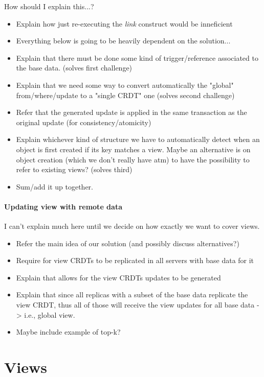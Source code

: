 \documentclass{vldb}
\newcommand{\grumbler}[2]{{\color{red}{\bf #1:} #2}}
\newcommand{\andre}[1]{\grumbler{andre}{#1}}
\begin{document}
\andre{How should I explain this...?}

\begin{itemize}
	\item Explain how just re-executing the \emph{link} construct would be inneficient
	\item Everything below is going to be heavily dependent on the solution... 
	\item Explain that there must be done some kind of trigger/reference associated to the base data. (solves first challenge)
	\item Explain that we need some way to convert automatically the "global" from/where/update to a "single CRDT" one (solves second challenge)
	\item Refer that the generated update is applied in the same transaction as the original update (for consistency/atomicity)
	\item Explain whichever kind of structure we have to automatically detect when an object is first created if its key matches a view. Maybe an alternative is on object creation (which we don't really have atm) to have the possibility to refer to existing views? (solves third)
	\item Sum/add it up together.
\end{itemize}

\paragraph{Updating view with remote data}

\andre{I can't explain much here until we decide on how exactly we want to cover views.}

\begin{itemize}
	\item Refer the main idea of our solution (and possibly discuss alternatives?)
	\item Require for view CRDTs to be replicated in all servers with base data for it
	\item Explain that allows for the view CRDTs updates to be generated
	\item Explain that since all replicas with a subset of the base data replicate the view CRDT, thus all of those will receive the view updates for all base data -> i.e., global view.
	\item Maybe include example of top-k?
\end{itemize}

\section{Views}
\label{subsec:viewsconsistency}
\end{document}
